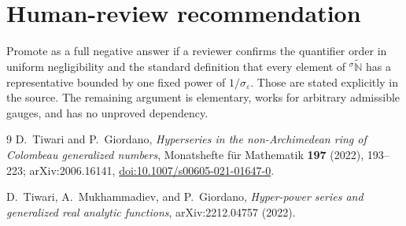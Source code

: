 \documentclass[11pt]{article}
\newcommand{\N}{\mathbb N}
\newcommand{\eps}{\varepsilon}
\newcommand{\Ns}{{}^{\sigma}\widetilde{\N}}
\begin{document}
\section{Human-review recommendation}

Promote as a full negative answer if a reviewer confirms the quantifier order
in uniform negligibility and the standard definition that every element of
$\Ns$ has a representative bounded by one fixed power of
$1/\sigma_\eps$.  Those are stated explicitly in the source.  The remaining
argument is elementary, works for arbitrary admissible gauges, and has no
unproved dependency.

\begin{thebibliography}{9}
D.~Tiwari and P.~Giordano,
\emph{Hyperseries in the non-Archimedean ring of Colombeau generalized
numbers}, Monatshefte f\"ur Mathematik \textbf{197} (2022), 193--223;
arXiv:2006.16141,
\href{https://doi.org/10.1007/s00605-021-01647-0}{doi:10.1007/s00605-021-01647-0}.

D.~Tiwari, A.~Mukhammadiev, and P.~Giordano,
\emph{Hyper-power series and generalized real analytic functions},
arXiv:2212.04757 (2022).
\end{thebibliography}
\end{document}
